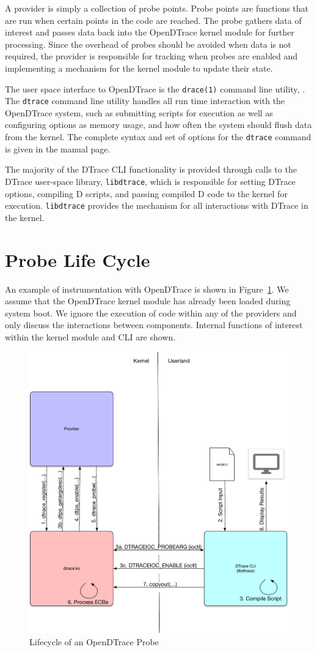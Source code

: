 A provider is simply a collection of probe points. Probe points are
functions that are run when certain points in the code are
reached. The probe gathers data of interest and passes data back into
the OpenDTrace kernel module for further processing. Since the
overhead of probes should be avoided when data is not required, the
provider is responsible for tracking when probes are enabled and
implementing a mechanism for the kernel module to update their state.

The user space interface to OpenDTrace is the \texttt{drace(1)}
command line utility, . The \texttt{dtrace} command line utility
handles all run time interaction with the OpenDTrace system, such as
submitting scripts for execution as well as configuring options as
memory usage, and how often the system should flush data from the
kernel.  The complete syntax and set of options for the
\texttt{dtrace} command is given in the manual page.

The majority of the DTrace CLI functionality is provided through calls
to the DTrace user-space library, \texttt{libdtrace}, which is
responsible for setting DTrace options, compiling D scripts, and
passing compiled D code to the kernel for
execution. \texttt{libdtrace} provides the mechanism for all
interactions with DTrace in the kernel.

\section{Probe Life Cycle}
\label{sec:lifecycle}

An example of instrumentation with OpenDTrace is shown in
Figure~\ref{fig:lifecycle}. We assume that the OpenDTrace kernel
module has already been loaded during system boot. We ignore the
execution of code within any of the providers and only discuss the
interactions between components. Internal functions of interest within
the kernel module and CLI are shown.

\begin{figure}[htpb]
	\centering
	\includegraphics[width=0.8\linewidth]{dtrace-lifecycle.pdf}
	\caption{Lifecycle of an OpenDTrace Probe}
	\label{fig:lifecycle}
\end{figure}

